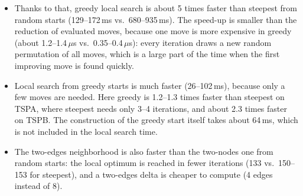 \documentclass[11pt,a4paper]{article}
\begin{document}
\begin{itemize}
  \item Thanks to that, greedy local search is about 5 times faster than steepest from random starts
        (129--172\,ms vs.\ 680--935\,ms). The speed-up is smaller than the reduction of evaluated
        moves, because one move is more expensive in greedy (about 1.2--1.4\,$\mu$s vs.\
        0.35--0.4\,$\mu$s): every iteration draws a new random permutation of all moves, which is
        a large part of the time when the first improving move is found quickly.
  \item Local search from greedy starts is much faster (26--102\,ms), because only a few moves are
        needed. Here greedy is 1.2--1.3 times faster than steepest on TSPA, where steepest needs only
        3--4 iterations, and about 2.3 times faster on TSPB. The construction of the greedy start
        itself takes about 64\,ms, which is not included in the local search time.
  \item The two-edges neighborhood is also faster than the two-nodes one from random starts:
        the local optimum is reached in fewer iterations (133 vs.\ 150--153 for steepest), and a
        two-edges delta is cheaper to compute (4 edges instead of 8).
\end{itemize}
\end{document}
